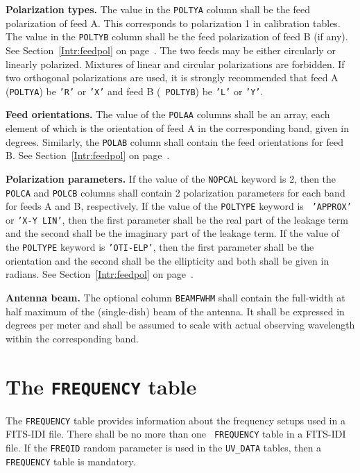 \documentclass[twoside]{article}
\newcommand{\Hi}[1]{\textcolor{hicol}{#1}}
\newcommand{\mecol}{\color{mecol}}
\newcommand{\hblack}{\color{black}}
\begin{document}
{\bf Polarization types.}  The value in the {\tt POLTYA} column shall
be the feed polarization of feed A\@.  This corresponds to
polarization 1 in calibration tables.  The value in the {\tt POLTYB}
column shall be the feed polarization of feed B (if any).  See
Section~\ref{Intr:feedpol} on page~\pageref{Intr:feedpol}.  The two
feeds may be either circularly or linearly polarized.  Mixtures of
linear and circular polarizations are forbidden.  If two orthogonal
polarizations are used, it is strongly recommended that feed A
\Hi{({\tt POLTYA})} be {\tt 'R'} or {\tt 'X'} and feed B \Hi{({\tt
POLTYB})} be {\tt 'L'} or {\tt 'Y'}\@.

{\bf Feed orientations.} The value of the {\tt POLAA} columns shall be
an array, each element of which is the orientation of feed A in the
corresponding band, given in degrees.  \Hi{Similarly,} the {\tt POLAB}
column shall contain the feed orientations for feed B\@.  See
Section~\ref{Intr:feedpol} on page~\pageref{Intr:feedpol}.

{\bf Polarization parameters.}  If the value of the {\tt NOPCAL}
keyword is 2, then the {\tt POLCA} and {\tt POLCB} columns shall
contain 2 polarization parameters for each band for feeds A and B,
respectively.  If the value of the {\tt POLTYPE} keyword is {\tt
  'APPROX'} or {\tt 'X-Y LIN'}, then the first parameter shall be the
real part of the leakage term and the second shall be the imaginary
part of the leakage term.  If the value of the {\tt POLTYPE} keyword
is {\tt 'OTI-ELP'}, then the first parameter shall be the orientation
and the second shall be the ellipticity and both shall be given in
radians.  See Section~\ref{Intr:feedpol} on
page~\pageref{Intr:feedpol}.

\mecol
{\bf Antenna beam.} The optional column {\tt BEAMFWHM} shall contain
the full-width at half maximum of the (single-dish) beam of the
antenna.  It shall be expressed in degrees per meter and shall be
assumed to scale with actual observing wavelength within the
corresponding band.
\hblack

\section{The {\tt FREQUENCY} table}
\label{s:FQ}

The {\tt FREQUENCY} table provides information about the frequency
setups used in a FITS-IDI file.  There shall be no more than one {\tt
FREQUENCY} table in a FITS-IDI file.  If the {\tt FREQID} \Hi{random}
parameter is used in the {\tt UV\_DATA} tables, then a {\tt FREQUENCY}
table is mandatory.
\end{document}
